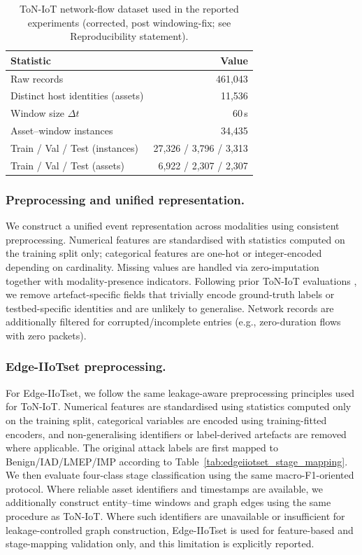 \documentclass[pdflatex,sn-mathphys-num]{sn-jnl}
\theoremstyle{thmstyleone}%
\theoremstyle{thmstyletwo}%
\theoremstyle{thmstylethree}%
\begin{document}
\begin{table}[!t]
\centering
\caption{ToN-IoT network-flow dataset used in the reported experiments (corrected, post windowing-fix; see Reproducibility statement).}
\label{tab:raw_modality_splits}
\renewcommand{\arraystretch}{1.12}
\begin{tabular}{lr}
\toprule
\textbf{Statistic} & \textbf{Value} \\
\midrule
Raw records & 461{,}043 \\
Distinct host identities (assets) & 11{,}536 \\
Window size $\Delta t$ & 60\,s \\
Asset--window instances & 34{,}435 \\
Train / Val / Test (instances) & 27{,}326 / 3{,}796 / 3{,}313 \\
Train / Val / Test (assets) & 6{,}922 / 2{,}307 / 2{,}307 \\
\bottomrule
\end{tabular}
\end{table}


\subsubsection{Preprocessing and unified representation.}
We construct a unified event representation across modalities using consistent preprocessing. Numerical features are standardised with statistics computed on the training split only; categorical features are one-hot or integer-encoded depending on cardinality. Missing values are handled via zero-imputation together with modality-presence indicators. Following prior ToN-IoT evaluations \cite{moustafa2021tonlinuxEval}, we remove artefact-specific fields that trivially encode ground-truth labels or testbed-specific identities and are unlikely to generalise. Network records are additionally filtered for corrupted/incomplete entries (e.g., zero-duration flows with zero packets).

\color{red}

\subsubsection{Edge-IIoTset preprocessing.}
For Edge-IIoTset, we follow the same leakage-aware preprocessing principles used for ToN-IoT. Numerical features are standardised using statistics computed only on the training split, categorical variables are encoded using training-fitted encoders, and non-generalising identifiers or label-derived artefacts are removed where applicable. The original attack labels are first mapped to Benign/IAD/LMEP/IMP according to Table~\ref{tab:edgeiiotset_stage_mapping}. We then evaluate four-class stage classification using the same macro-F1-oriented protocol. Where reliable asset identifiers and timestamps are available, we additionally construct entity--time windows and graph edges using the same procedure as ToN-IoT. Where such identifiers are unavailable or insufficient for leakage-controlled graph construction, Edge-IIoTset is used for feature-based and stage-mapping validation only, and this limitation is explicitly reported.
\end{document}
